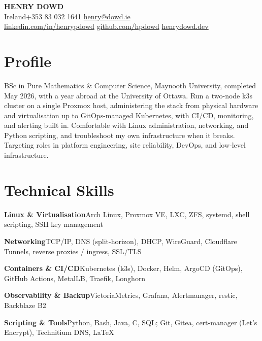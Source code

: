 \documentclass[a4paper,10pt]{article}
\newcommand{\skillsline}[2]{\noindent\textbf{#1}\enspace\enspace #2\par\vspace{1pt}}
\begin{document}
\begin{center}
  {\LARGE\bfseries HENRY DOWD}\\\vspace{4pt}
  Ireland\enspace\textperiodcentered\enspace+353 83 032 1641\enspace\textperiodcentered\enspace
  \href{mailto:henry@dowd.ie}{henry@dowd.ie}\\
  \href{https://www.linkedin.com/in/henrypdowd/}{linkedin.com/in/henrypdowd}%
  \enspace\textperiodcentered\enspace
  \href{https://github.com/hpdowd}{github.com/hpdowd}%
  \enspace\textperiodcentered\enspace
  \href{https://henrydowd.dev}{henrydowd.dev}
\end{center}

\section{Profile}
BSc in Pure Mathematics \& Computer Science, Maynooth University, completed May 2026, with a year abroad at the University of Ottawa. Run a two-node k3s cluster on a single Proxmox host, administering the stack from physical hardware and virtualisation up to GitOps-managed Kubernetes, with CI/CD, monitoring, and alerting built in. Comfortable with Linux administration, networking, and Python scripting, and troubleshoot my own infrastructure when it breaks. Targeting roles in platform engineering, site reliability, DevOps, and low-level infrastructure.

\section{Technical Skills}
\skillsline{Linux \& Virtualisation}{Arch Linux, Proxmox VE, LXC, ZFS, systemd, shell scripting, SSH key management}
\skillsline{Networking}{TCP/IP, DNS (split-horizon), DHCP, WireGuard, Cloudflare Tunnels, reverse proxies / ingress, SSL/TLS}
\skillsline{Containers \& CI/CD}{Kubernetes (k3s), Docker, Helm, ArgoCD (GitOps), GitHub Actions, MetalLB, Traefik, Longhorn}
\skillsline{Observability \& Backup}{VictoriaMetrics, Grafana, Alertmanager, restic, Backblaze B2}
\skillsline{Scripting \& Tools}{Python, Bash, Java, C, SQL; Git, Gitea, cert-manager (Let's Encrypt), Technitium DNS, \LaTeX}
\end{document}
